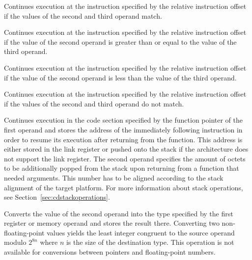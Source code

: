 Continues execution at the instruction specified by the relative instruction offset if the values of the second and third operand match.


Continues execution at the instruction specified by the relative instruction offset if the value of the second operand is greater than or equal to the value of the third operand.


Continues execution at the instruction specified by the relative instruction offset if the value of the second operand is less than the value of the third operand.


Continues execution at the instruction specified by the relative instruction offset if the values of the second and third operand do not match.


Continues execution in the code section specified by the function pointer of the first operand and stores the address of the immediately following instruction in order to resume its execution after returning from the function.
This address is either stored in the link register or pushed onto the stack if the architecture does not support the link register.
The second operand specifies the amount of octets to be additionally popped from the stack upon returning from a function that needed arguments.
This number has to be aligned according to the stack alignment of the target platform.
For more information about stack operations, see Section~\ref{sec:cdstackoperations}.


Converts the value of the second operand into the type specified by the first register or memory operand and stores the result there.
Converting two non-floating-point values yields the least integer congruent to the source operand modulo $2^{8n}$ where $n$ is the size of the destination type.
This operation is not available for conversions between pointers and floating-point numbers.


